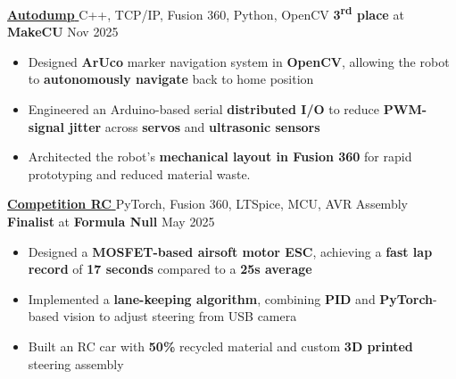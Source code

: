 \documentclass[10pt]{article}
\begin{document}
\noindent\href{https://devpost.com/software/autodump-autonomous-self-emptying-trash-rover}{\textbf{Autodump \footnotesize\faExternalLink*}} \hspace{\WEVBsep}\textbar\hspace{\WEVBsep} C++, TCP/IP, Fusion 360, Python, OpenCV \hfill \textbf{3\textsuperscript{rd} place} at \textbf{MakeCU       } Nov 2025 \\[\PTtPsep]
\begin{itemize}
    \item  Designed \textbf{ArUco} marker navigation system in \textbf{OpenCV}, allowing the robot to \textbf{autonomously navigate} back to home position \\[\PtPsep]
    \item  Engineered an Arduino-based serial \textbf{distributed I/O} to {reduce} \textbf{PWM-signal jitter} across \textbf{servos} and \textbf{ultrasonic sensors} \\[\PtPsep]
    \item  Architected the robot’s \textbf{mechanical layout in Fusion 360} for rapid prototyping and reduced material waste.\\[\PStPSsep]
\end{itemize}

\noindent\href{https://github.com/RyanQin24/FormulaNULL-MotorDrivers?tab=readme-ov-file}{\textbf{Competition RC \footnotesize\faExternalLink*}} \hspace{\WEVBsep}\textbar\hspace{\WEVBsep} PyTorch, Fusion 360, LTSpice, MCU, AVR Assembly \hfill \textbf{Finalist} at \textbf{Formula Null       } May 2025 \\[\PTtPsep]
\begin{itemize}
    \item  Designed a \textbf{MOSFET-based airsoft motor ESC}, achieving a \textbf{fast lap record} of \textbf{17 seconds} compared to a \textbf{25s average}\\[\PtPsep]
    \item  Implemented a \textbf{lane-keeping algorithm}, combining \textbf{PID} and \textbf{PyTorch}-based vision to adjust steering from USB camera \\[\PtPsep]
    \item  Built an RC car with \textbf{50\%} recycled material and custom \textbf{3D printed} steering assembly \\[\PStPSsep]
\end{itemize}
\end{document}

